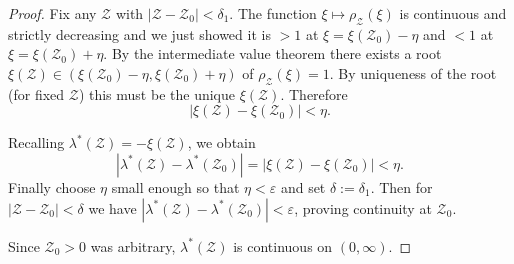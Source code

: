 \documentclass[10pt,a4paper]{amsart}
\begin{document}
\begin{proof}
Fix any \(\mathcal Z\) with \(|\mathcal Z-\mathcal Z_0|<\delta_1\). The function \(\xi\mapsto\rho_{\mathcal Z}(\xi)\)
is continuous and strictly decreasing and we just showed it is \(>1\) at \(\xi=\xi(\mathcal Z_0)-\eta\) and \(<1\)
at \(\xi=\xi(\mathcal Z_0)+\eta\). By the intermediate value theorem there exists a root \(\xi(\mathcal Z)\in
(\xi(\mathcal Z_0)-\eta,\xi(\mathcal Z_0)+\eta)\) of \(\rho_{\mathcal Z}(\xi)=1\). By uniqueness of the root
(for fixed \(\mathcal Z\)) this must be the unique \(\xi(\mathcal Z)\). Therefore
\[
|\xi(\mathcal Z)-\xi(\mathcal Z_0)|<\eta.
\]

Recalling  \(\lambda^\ast(\mathcal Z)=-\xi(\mathcal Z)\), we obtain
\[
|\lambda^\ast(\mathcal Z)-\lambda^\ast(\mathcal Z_0)| = |\xi(\mathcal Z)-\xi(\mathcal Z_0)| < \eta.
\]
Finally choose \(\eta\) small enough so that \(\eta<\varepsilon\) and set \(\delta:=\delta_1\). Then for
\(|\mathcal Z-\mathcal Z_0|<\delta\) we have \(|\lambda^\ast(\mathcal Z)-\lambda^\ast(\mathcal Z_0)|<\varepsilon\),
proving continuity at \(\mathcal Z_0\).

Since \(\mathcal Z_0>0\) was arbitrary, \(\lambda^\ast(\mathcal Z)\) is continuous on \((0,\infty)\).

\end{proof}
\end{document}
